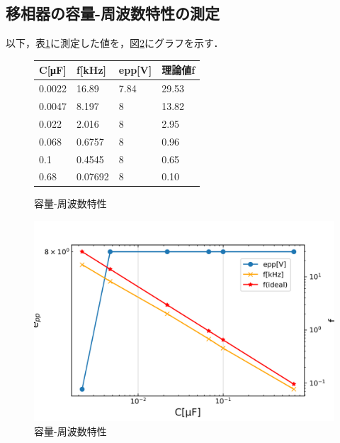 \documentclass[10pt, a4j, dvipdfmx]{jarticle}
\makeatletter
\newcommand{\figcaption}[1]{\def\@captype{figure}\caption{#1}}
\newcommand{\tblcaption}[1]{\def\@captype{table}\caption{#1}}
\makeatother
\begin{document}
      \subsection{移相器の容量-周波数特性の測定}
      以下，表\ref{tbl:2}に測定した値を，図\ref{fig:ex-8}にグラフを示す．
      \small
        \begin{figure}[H]
            \centering
            \tblcaption{容量-周波数特性}
            \label{tbl:2}
            \begin{tabular}{|l|l|l|l|}
                \hline
                C{[}μF{]} & f{[}kHz{]} & epp{[}V{]} & 理論値f  \\ \hline
                0.0022    & 16.89      & 7.84       & 29.53 \\ \hline
                0.0047    & 8.197      & 8          & 13.82 \\ \hline
                0.022     & 2.016      & 8          & 2.95  \\ \hline
                0.068     & 0.6757     & 8          & 0.96  \\ \hline
                0.1       & 0.4545     & 8          & 0.65  \\ \hline
                0.68      & 0.07692    & 8          & 0.10  \\ \hline
                \end{tabular}
        \end{figure}
        \normalsize
        \begin{figure}[H]
            \centering
            \includegraphics[width=\hsize]{ex_2.png}
            \figcaption{容量-周波数特性}
            \label{fig:ex-8}
          \end{figure}
\end{document}
